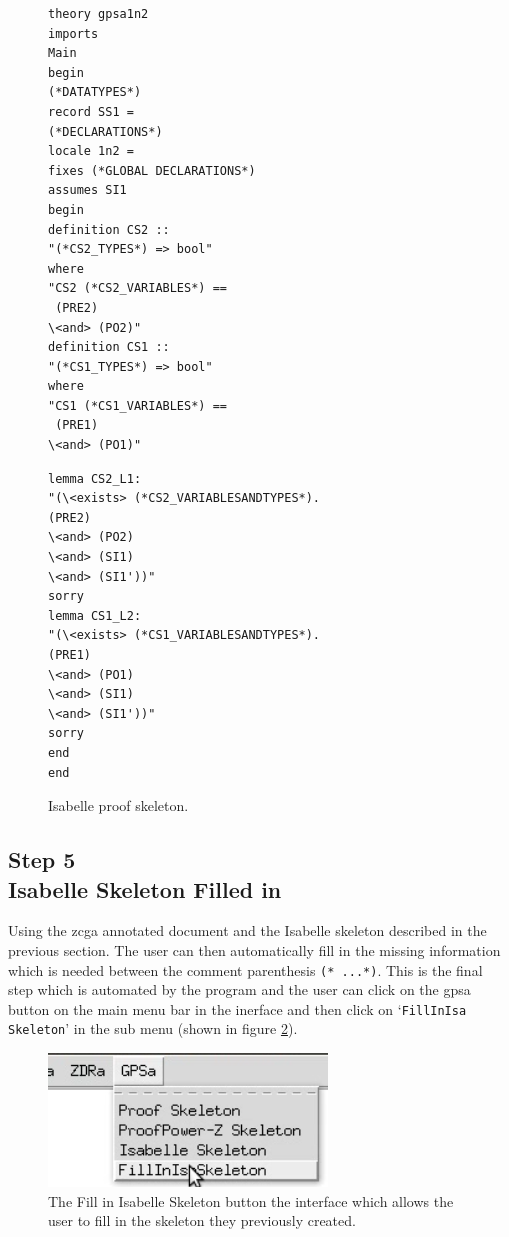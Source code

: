 \begin{figure}[H]
\centering
\begin{minipage}{0.45\textwidth}
\centering
\begin{scriptsize}
\begin{BVerbatim}
theory gpsa1n2
imports 
Main 
begin 
(*DATATYPES*)
record SS1 = 
(*DECLARATIONS*)
locale 1n2 = 
fixes (*GLOBAL DECLARATIONS*) 
assumes SI1
begin
definition CS2 :: 
"(*CS2_TYPES*) => bool"
where 
"CS2 (*CS2_VARIABLES*) ==
 (PRE2)
\<and> (PO2)"
definition CS1 :: 
"(*CS1_TYPES*) => bool"
where 
"CS1 (*CS1_VARIABLES*) ==
 (PRE1)
\<and> (PO1)"
\end{BVerbatim}
\end{scriptsize}
\end{minipage}\hfill
\begin{minipage}{0.45\textwidth}
\begin{scriptsize}
\begin{BVerbatim}
lemma CS2_L1:
"(\<exists> (*CS2_VARIABLESANDTYPES*).
(PRE2)
\<and> (PO2)
\<and> (SI1)
\<and> (SI1'))"
sorry
lemma CS1_L2:
"(\<exists> (*CS1_VARIABLESANDTYPES*).
(PRE1)
\<and> (PO1)
\<and> (SI1)
\<and> (SI1'))"
sorry
end
end
\end{BVerbatim}
\end{scriptsize}
\end{minipage}
\caption{Isabelle proof skeleton. \label{fig:isaFullexample}}
\end{figure}

\subsection{Step 5\\Isabelle Skeleton Filled in}

Using the \gls{zcga} annotated document and the Isabelle skeleton described in the previous section. The user can then automatically fill in the missing information which is needed between the comment parenthesis \verb|(* ...*)|. This is the final step which is automated by the program and the user can click on the \gls{gpsa} button on the main menu bar in the inerface and then click on `\texttt{FillInIsa Skeleton}' in the sub menu (shown in figure \ref{fig:fillinisa}).

\begin{figure}[H]
\centering
\includegraphics[scale=0.45]{Figures/fullexample/fillinisa.png}
\caption{The Fill in Isabelle Skeleton button the interface which allows the user to fill in the skeleton they previously created. \label{fig:fillinisa}}
\end{figure}

